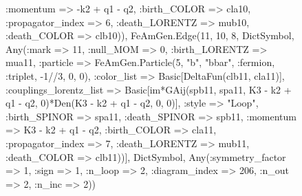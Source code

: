 \documentclass{revtex4}
\begin{document}
\begin{figure}[!htb]
\begin{center}
{:momentum => -k2 + q1 - q2, :birth_COLOR => cla10, :propagator_index => 6, :death_LORENTZ => mub10, :death_COLOR => clb10)), FeAmGen.Edge(11, 10, 8, Dict{Symbol, Any}(:mark => 11, :null_MOM => 0, :birth_LORENTZ => mua11, :particle => FeAmGen.Particle(5, "b", "bbar", :fermion, :triplet, -1//3, 0, 0), :color_list => Basic[DeltaFun(clb11, cla11)], :couplings_lorentz_list => Basic[im*GAij(spb11, spa11, K3 - k2 + q1 - q2, 0)*Den(K3 - k2 + q1 - q2, 0, 0)], :style => "Loop", :birth_SPINOR => spa11, :death_SPINOR => spb11, :momentum => K3 - k2 + q1 - q2, :birth_COLOR => cla11, :propagator_index => 7, :death_LORENTZ => mub11, :death_COLOR => clb11))], Dict{Symbol, Any}(:symmetry_factor => 1, :sign => 1, :n_loop => 2, :diagram_index => 206, :n_out => 2, :n_inc => 2)) 
}
\end{center}
\end{figure}
\end{document}
